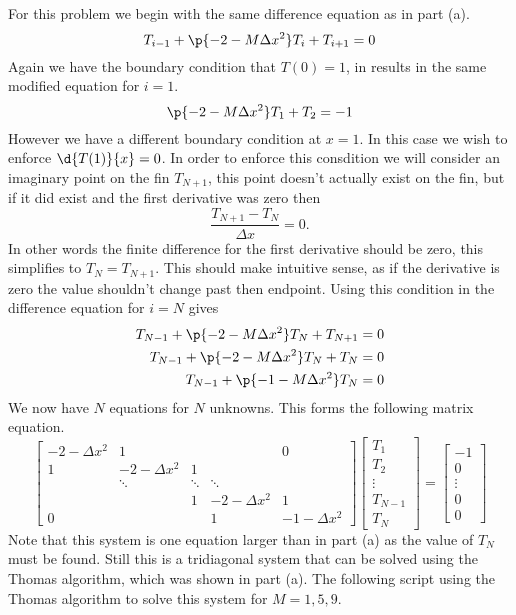 \documentclass[11pt, oneside]{article}
\begin{document}
\begin{enumerate}
\begin{enumerate}
        For this problem we begin with the same difference equation as in part (a).
        \[
          T_{i - 1} + \p{- 2 - M\Delta x^2}T_i + T_{i+1} = 0
        \]
        Again we have the boundary condition that $T(0) = 1$, in results in
        the same modified equation for $i = 1$.
        \[
           \p{- 2 - M\Delta x^2}T_1 + T_2 = -1
        \]
        However we have a different boundary condition at $x = 1$.
        In this case we wish to enforce $\d{T(1)}{x} = 0$.
        In order to enforce this consdition we will consider an
        imaginary point on the fin $T_{N + 1}$, this point doesn't actually
        exist on the fin, but if it did exist and the first derivative was
        zero then
        \[
          \frac{T_{N + 1} - T_N}{\Delta x} = 0.
        \]
        In other words the finite difference for the first derivative
        should be zero, this simplifies to $T_N = T_{N + 1}$.
        This should make intuitive sense, as if the derivative is zero the value
        shouldn't change past then endpoint.
        Using this condition in the difference equation for $i = N$ gives
        \begin{align*}
          T_{N - 1} + \p{- 2 - M\Delta x^2}T_N + T_{N+1} &= 0 \\
          T_{N - 1} + \p{- 2 - M\Delta x^2}T_N + T_{N} &= 0 \\
          T_{N - 1} + \p{-1 - M\Delta x^2}T_N &= 0
        \end{align*}
        We now have $N$ equations for $N$ unknowns.
        This forms the following matrix equation.
        \[
          \begin{bmatrix}
            -2 - \Delta x^2 & 1 & & & 0 \\
            1 & -2 - \Delta x^2 & 1 &  \\
             & \ddots & \ddots & \ddots &  \\
             &  & 1 & -2 - \Delta x^2  & 1  \\
            0 &  &  & 1 & -1 - \Delta x^2
          \end{bmatrix}
          \begin{bmatrix}
            T_1 \\
            T_2 \\
            \vdots \\
            T_{N - 1} \\
            T_{N}
          \end{bmatrix}
          =
          \begin{bmatrix}
            -1 \\
            0 \\
            \vdots \\
            0 \\
            0
          \end{bmatrix}
        \]
        Note that this system is one equation larger than in part (a) as
        the value of $T_N$ must be found.
        Still this is a tridiagonal system that can be solved using the Thomas
        algorithm, which was shown in part (a).
        The following script using the Thomas algorithm to solve this system for
        $M = 1, 5, 9$.


\end{enumerate}
\end{enumerate}
\end{document}

